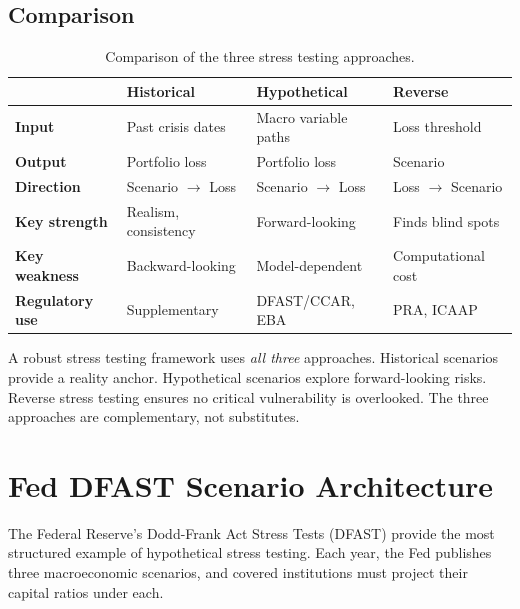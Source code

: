 \documentclass[11pt, a4paper]{article}
\theoremstyle{definition}
\theoremstyle{plain}
\theoremstyle{remark}
\begin{document}
\subsection{Comparison}

\begin{table}[H]
\centering
\begin{tabular}{@{}p{3cm}p{3.5cm}p{3.5cm}p{3.5cm}@{}}
\toprule
& \textbf{Historical} & \textbf{Hypothetical} & \textbf{Reverse} \\
\midrule
\textbf{Input} & Past crisis dates & Macro variable paths & Loss threshold \\
\textbf{Output} & Portfolio loss & Portfolio loss & Scenario \\
\textbf{Direction} & Scenario $\to$ Loss & Scenario $\to$ Loss & Loss $\to$ Scenario \\
\textbf{Key strength} & Realism, consistency & Forward-looking & Finds blind spots \\
\textbf{Key weakness} & Backward-looking & Model-dependent & Computational cost \\
\textbf{Regulatory use} & Supplementary & DFAST/CCAR, EBA & PRA, ICAAP \\
\bottomrule
\end{tabular}
\caption{Comparison of the three stress testing approaches.}
\end{table}

\begin{keyresult}
A robust stress testing framework uses \emph{all three} approaches.
Historical scenarios provide a reality anchor.
Hypothetical scenarios explore forward-looking risks.
Reverse stress testing ensures no critical vulnerability is overlooked.
The three approaches are complementary, not substitutes.
\end{keyresult}

\section{Fed DFAST Scenario Architecture}
\label{sec:dfast}

The Federal Reserve's Dodd-Frank Act Stress Tests (DFAST) provide the most structured
example of hypothetical stress testing.
Each year, the Fed publishes three macroeconomic scenarios,
and covered institutions must project their capital ratios under each.
\end{document}
